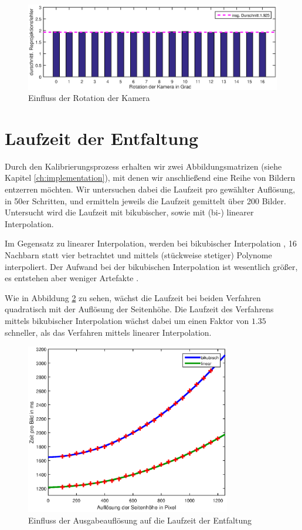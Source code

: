 \begin{figure}[!htb]
	\centering
	\includegraphics[width=\textwidth]{images/reprojectionErrorDeg2.eps}
	\caption{Einfluss der Rotation der Kamera}
	\label{fig:influenceRot}
\end{figure}


\section{Laufzeit der Entfaltung}
Durch den Kalibrierungsprozess erhalten wir zwei Abbildungsmatrizen (siehe Kapitel \ref{ch:implementation}), mit denen wir anschließend eine Reihe von Bildern entzerren möchten. Wir untersuchen dabei die Laufzeit pro gewählter Auflösung, in 50er Schritten, und ermitteln jeweils die Laufzeit gemittelt über 200 Bilder. Untersucht wird die Laufzeit mit bikubischer, sowie mit (bi-) linearer Interpolation. 

Im Gegensatz zu linearer Interpolation, werden bei bikubischer Interpolation , 16 Nachbarn statt vier betrachtet und mittels (stückweise stetiger) Polynome interpoliert. Der Aufwand bei der bikubischen Interpolation ist wesentlich größer, es entstehen aber weniger Artefakte \cite{Keys1981}.

Wie in Abbildung \ref{fig:influenceRes2} zu sehen, wächst die Laufzeit bei beiden Verfahren quadratisch mit der Auflösung der Seitenhöhe. Die Laufzeit des Verfahrens mittels bikubischer Interpolation wächst dabei um einen Faktor von $1.35$ schneller, als das Verfahren mittels linearer Interpolation.

\begin{figure}[!htb]
	\centering
	\includegraphics[width=0.8\textwidth]{images/runningTimePerSlantheight.eps}
	\caption{Einfluss der Ausgabeauflösung auf die Laufzeit der Entfaltung}
	\label{fig:influenceRes2}
\end{figure}

